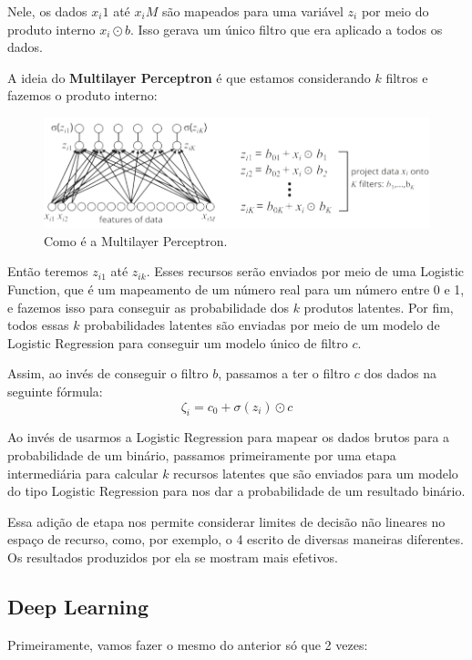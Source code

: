 \documentclass[11pt, a4paper]{article}
\begin{document}
Nele, os dados $x_i1$ até $x_iM$ são mapeados para uma variável $z_i$ por meio do produto interno $x_i \odot b$. Isso gerava um único filtro que era aplicado a todos os dados.

A ideia do \textbf{Multilayer Perceptron} é que estamos considerando $k$ filtros e fazemos o produto interno: 

\begin{figure}[h]
\centering
\includegraphics[scale=0.3]{6thMTP}
\caption{Como é a Multilayer Perceptron.}
\end{figure}

Então teremos $z_{i1}$ até $z_{ik}$. Esses recursos serão enviados por meio de uma Logistic Function, que é um mapeamento de um número real para um número entre 0 e 1, e fazemos isso para conseguir as probabilidade dos $k$ produtos latentes. Por fim, todos essas $k$ probabilidades latentes são enviadas por meio de um modelo de Logistic Regression para conseguir um modelo único de filtro $c$.

Assim, ao invés de conseguir o filtro $b$, passamos a ter o filtro $c$ dos dados na seguinte fórmula:
$$ \zeta _i = c_0 + \sigma (z_i) \odot c $$

Ao invés de usarmos a Logistic Regression para mapear os dados brutos para a probabilidade de um binário, passamos primeiramente por uma etapa intermediária para calcular $k$ recursos latentes que são enviados para um modelo do tipo Logistic Regression para nos dar a probabilidade de um resultado binário.

Essa adição de etapa nos permite considerar limites de decisão não lineares no espaço de recurso, como, por exemplo, o 4 escrito de diversas maneiras diferentes. Os resultados produzidos por ela se mostram mais efetivos.

\subsection{Deep Learning}

Primeiramente, vamos fazer o mesmo do anterior só que 2 vezes:
\end{document}
